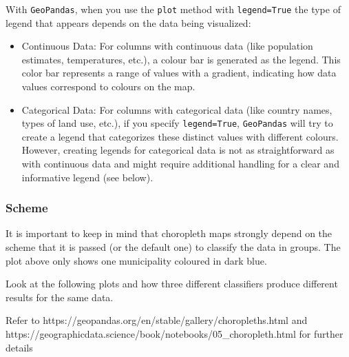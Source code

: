 \documentclass[
  letterpaper,
  DIV=11,
  numbers=noendperiod]{scrreprt}
\providecommand{\tightlist}{%
  \setlength{\itemsep}{0pt}\setlength{\parskip}{0pt}}\usepackage{longtable,booktabs,array}
\begin{document}
With \texttt{GeoPandas}, when you use the \texttt{plot} method with
\texttt{legend=True} the type of legend that appears depends on the data
being visualized:

\begin{itemize}
\tightlist
\item
  Continuous Data: For columns with continuous data (like population
  estimates, temperatures, etc.), a colour bar is generated as the
  legend. This color bar represents a range of values with a gradient,
  indicating how data values correspond to colours on the map.
\item
  Categorical Data: For columns with categorical data (like country
  names, types of land use, etc.), if you specify \texttt{legend=True},
  \texttt{GeoPandas} will try to create a legend that categorizes these
  distinct values with different colours. However, creating legends for
  categorical data is not as straightforward as with continuous data and
  might require additional handling for a clear and informative legend
  (see below).
\end{itemize}

\hypertarget{scheme}{%
\subsubsection{Scheme}\label{scheme}}

It is important to keep in mind that choropleth maps strongly depend on
the scheme that it is passed (or the default one) to classify the data
in groups. The plot above only shows one municipality coloured in dark
blue.

Look at the following plots and how three different classifiers produce
different results for the same data.

Refer to https://geopandas.org/en/stable/gallery/choropleths.html and
https://geographicdata.science/book/notebooks/05\_choropleth.html for
further details
\end{document}
